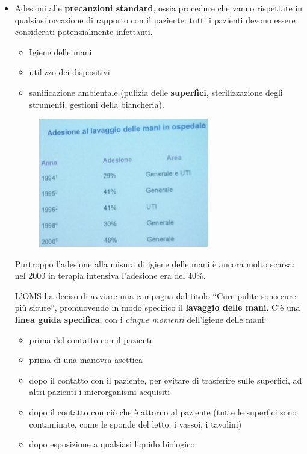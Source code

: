 \begin{itemize}
\item Adesioni alle \textbf{precauzioni standard}, ossia procedure che vanno rispettate in qualsiasi occasione di rapporto con il paziente: tutti i pazienti devono essere considerati potenzialmente infettanti.

  \begin{itemize}
    \item Igiene delle mani
    \item utilizzo dei dispositivi
    \item sanificazione ambientale (pulizia delle \textbf{superfici}, sterilizzazione degli strumenti, gestioni della biancheria).
  \end{itemize}

\begin{figure}[!ht]
\centering
	\includegraphics[width=0.7\textwidth]{19/image12.jpeg}
	\end{figure}

Purtroppo l'adesione alla misura di igiene delle mani è ancora molto scarsa: nel 2000 in terapia intensiva l'adesione era del 40\%.

L'OMS ha deciso di avviare una campagna dal titolo ``Cure pulite sono cure più sicure'', promuovendo in modo specifico il \textbf{lavaggio delle mani}. C'è una \textbf{linea guida specifica}, con i \emph{cinque momenti} dell'igiene delle mani:

\begin{itemize}
\item prima del contatto con il paziente
\item prima di una manovra asettica
\item dopo il contatto con il paziente, per evitare di trasferire sulle superfici, ad altri pazienti i microrganismi acquisiti
\item dopo il contatto con ciò che è attorno al paziente (tutte le superfici sono contaminate, come le sponde del letto, i vassoi, i tavolini)
\item dopo esposizione a qualsiasi liquido biologico.
\end{itemize}


\end{itemize}
